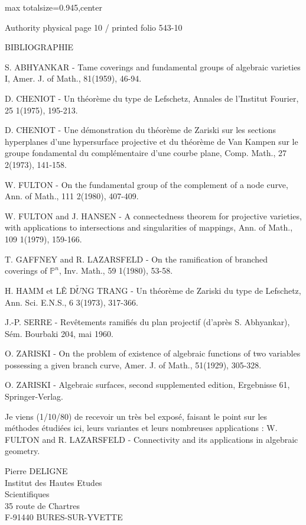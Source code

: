 \documentclass[10pt,a4paper]{article}
\begin{document}
\noindent\begin{adjustbox}{max totalsize={\textwidth}{0.945\textheight},center}
\begin{minipage}{\textwidth}
\noindent\hfill\scriptsize Authority physical page 10 / printed folio 543-10\par\normalsize
\noindent BIBLIOGRAPHIE\par\smallskip
\noindent [1] S. ABHYANKAR - Tame coverings and fundamental groups of algebraic varieties I, Amer. J. of Math., 81(1959), 46-94.\par\smallskip
\noindent [2] D. CHENIOT - Un théorème du type de Lefschetz, Annales de l'Institut Fourier, 25 1(1975), 195-213.\par\smallskip
\noindent [2 bis] D. CHENIOT - Une démonstration du théorème de Zariski sur les sections hyperplanes d'une hypersurface projective et du théorème de Van Kampen sur le groupe fondamental du complémentaire d'une courbe plane, Comp. Math., 27 2(1973), 141-158.\par\smallskip
\noindent [3] W. FULTON - On the fundamental group of the complement of a node curve, Ann. of Math., 111 2(1980), 407-409.\par\smallskip
\noindent [4] W. FULTON and J. HANSEN - A connectedness theorem for projective varieties, with applications to intersections and singularities of mappings, Ann. of Math., 109 1(1979), 159-166.\par\smallskip
\noindent [5] T. GAFFNEY and R. LAZARSFELD - On the ramification of branched coverings of \ensuremath{ℙ^n}, Inv. Math., 59 1(1980), 53-58.\par\smallskip
\noindent [6] H. HAMM et LÊ D\ensuremath{\widetilde{U}}NG TRANG - Un théorème de Zariski du type de Lefschetz, Ann. Sci. E.N.S., 6 3(1973), 317-366.\par\smallskip
\noindent [7] J.-P. SERRE - Revêtements ramifiés du plan projectif (d'après S. Abhyankar), Sém. Bourbaki 204, mai 1960.\par\smallskip
\noindent [8] O. ZARISKI - On the problem of existence of algebraic functions of two variables possessing a given branch curve, Amer. J. of Math., 51(1929), 305-328.\par\smallskip
\noindent [9] O. ZARISKI - Algebraic surfaces, second supplemented edition, Ergebnisse 61, Springer-Verlag.\par\smallskip
\noindent Je viens (1/10/80) de recevoir un très bel exposé, faisant le point sur les méthodes étudiées ici, leurs variantes et leurs nombreuses applications : W. FULTON and R. LAZARSFELD - Connectivity and its applications in algebraic geometry.\par\smallskip
\noindent Pierre DELIGNE\\Institut des Hautes Etudes\\Scientifiques\\35 route de Chartres\\F-91440 BURES-SUR-YVETTE\par\smallskip
\end{minipage}
\end{adjustbox}
\end{document}
